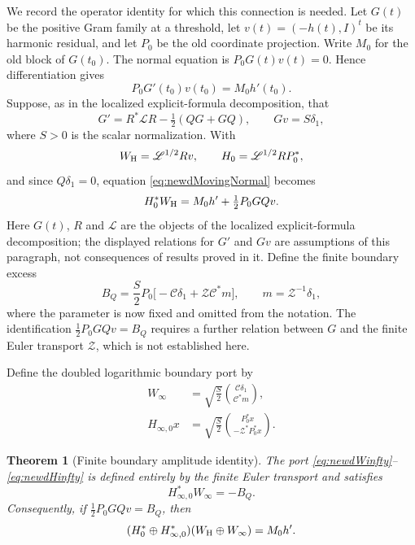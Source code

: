 \documentclass[11pt]{amsart}
\newtheorem{theorem}{Theorem}[section]
\theoremstyle{definition}
\theoremstyle{remark}
\begin{document}
We record the operator identity for which this connection is needed.  Let
$G(t)$ be the positive Gram family at a threshold, let
$v(t)=(-h(t),I)^t$ be its harmonic residual, and let $P_0$ be the old
coordinate projection.  Write $M_0$ for the old block of $G(t_0)$.  The
normal equation is $P_0G(t)v(t)=0$.  Hence differentiation gives
\begin{equation}\label{eq:newdMovingNormal}
 P_0G'(t_0)v(t_0)=M_0h'(t_0).
\end{equation}
Suppose, as in the localized explicit-formula decomposition, that
\[
 G'=R^*\mathscr LR-\tfrac12(QG+GQ),
 \qquad Gv=S\delta_1,
\]
where $S>0$ is the scalar normalization.  With
\[
 W_{\rm H}=\mathscr L^{1/2}Rv,
 \qquad H_0=\mathscr L^{1/2}RP_0^*,
\]
and since $Q\delta_1=0$, equation \eqref{eq:newdMovingNormal} becomes
\[
 H_0^*W_{\rm H}=M_0h'+\tfrac12P_0GQv .
\]
Here $G(t)$, $R$ and $\mathscr L$ are the objects of the localized
explicit-formula decomposition; the displayed relations for $G'$ and $Gv$ are
assumptions of this paragraph, not consequences of results proved in it.
Define the finite boundary excess
\begin{equation}\label{eq:newdFiniteExcess}
 B_Q=\frac S2P_0
 \bigl[-\mathscr C\delta_1+\mathscr Z\mathscr C^*m\bigr],
 \qquad m=\mathscr Z^{-1}\delta_1,
\end{equation}
where the parameter is now fixed and omitted from the notation.  The
identification $\tfrac12P_0GQv=B_Q$ requires a further relation between $G$
and the finite Euler transport $\mathscr Z$, which is not established here.

Define the doubled logarithmic boundary port by
\begin{align}
 W_\infty
 &=\sqrt{\frac S2}
   \binom{\mathscr C\delta_1}{\mathscr C^*m},
   \label{eq:newdWinfty}\\
 H_{\infty,0}x
 &=\sqrt{\frac S2}
   \binom{P_0^*x}{-\mathscr Z^*P_0^*x}.
   \label{eq:newdHinfty}
\end{align}

\begin{theorem}[Finite boundary amplitude identity]
\label{thm:newdAmplitude}
The port \eqref{eq:newdWinfty}--\eqref{eq:newdHinfty} is defined entirely
by the finite Euler transport and satisfies
\begin{equation}\label{eq:newdAmplitude}
 H_{\infty,0}^*W_\infty=-B_Q.
\end{equation}
Consequently, if $\tfrac12P_0GQv=B_Q$, then
\begin{equation}\label{eq:newdCompletedDivergence}
 (H_0^*\oplus H_{\infty,0}^*)
 (W_{\rm H}\oplus W_\infty)=M_0h'.
\end{equation}
\end{theorem}
\end{document}
